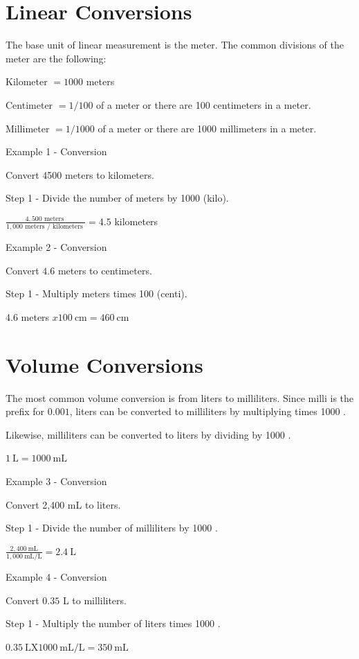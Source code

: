 \documentclass[10pt]{article}
\begin{document}
\section{Linear Conversions}
The base unit of linear measurement is the meter. The common divisions of the meter are the following:

Kilometer $=1000$ meters

Centimeter $=1 / 100$ of a meter or there are 100 centimeters in a meter.

Millimeter $=1 / 1000$ of a meter or there are 1000 millimeters in a meter.

Example 1 - Conversion

Convert 4500 meters to kilometers.

Step 1 - Divide the number of meters by 1000 (kilo).

$\frac{4,500 \text { meters }}{1,000 \text { meters } / \text { kilometers }}=4.5$ kilometers

Example 2 - Conversion

Convert $4.6$ meters to centimeters.

Step 1 - Multiply meters times 100 (centi).

$4.6$ meters $x 100 \mathrm{~cm}=460 \mathrm{~cm}$

\section{Volume Conversions}
The most common volume conversion is from liters to milliliters. Since milli is the prefix for $0.001$, liters can be converted to milliliters by multiplying times 1000 .

Likewise, milliliters can be converted to liters by dividing by 1000 .

$1 \mathrm{~L}=1000 \mathrm{~mL}$

Example 3 - Conversion

Convert 2,400 mL to liters.

Step 1 - Divide the number of milliliters by 1000 .

$\frac{2,400 \mathrm{~mL}}{1,000 \mathrm{~mL} / \mathrm{L}}=2.4 \mathrm{~L}$

Example 4 - Conversion

Convert $0.35$ L to milliliters.

Step 1 - Multiply the number of liters times 1000 .

$0.35 \mathrm{~L} \mathrm{X} 1000 \mathrm{~mL} / \mathrm{L}=350 \mathrm{~mL}$
\end{document}
